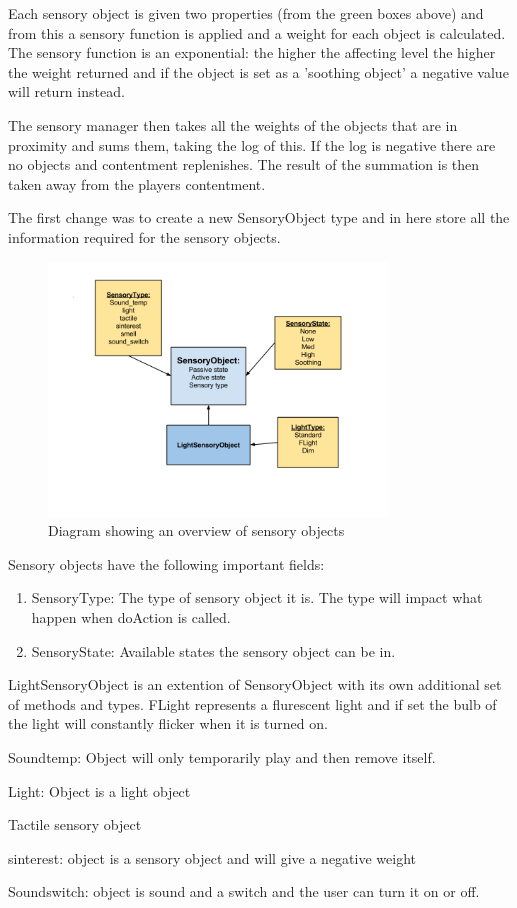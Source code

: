 \documentclass[11pt]{report}
\begin{document}
Each sensory object is given two properties (from the green boxes above) and from this a sensory function is applied and a weight for each object is calculated. The sensory function is an exponential: the higher the affecting level the higher the weight returned and if the object is set as a 'soothing object' a negative value will return instead. 

The sensory manager then takes all the weights of the objects that are in proximity and sums them, taking the log of this. If the log is negative there are no objects and contentment replenishes. The result of the summation is then taken away from the players contentment. 

The first change was to create a new SensoryObject type and in here store all the information required for the sensory objects. 

\begin{figure}[H]
\centering
\includegraphics[width=90mm]{images/implementationfirst/sensoryobject.png}
\caption{Diagram showing an overview of sensory objects}
\label{sensorysystem}
\end{figure}

Sensory objects have the following important fields:
\begin{enumerate}
\item SensoryType: The type of sensory object it is. The type will impact what happen when doAction is called.
\item SensoryState: Available states the sensory object can be in. 
\end{enumerate}

LightSensoryObject is an extention of SensoryObject with its own additional set of methods and types. FLight represents a flurescent light and if set the bulb of the light will constantly flicker when it is turned on.

\begin{description}
\item Soundtemp: Object will only temporarily play and then remove itself.
\item Light: Object is a light object
\item Tactile sensory object
\item sinterest: object is a sensory object and will give a negative weight
\item Soundswitch: object is sound and a switch and the user can turn it on or off.
\end{description}
\end{document}
